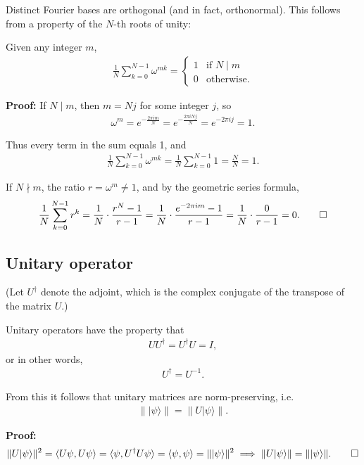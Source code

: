 \documentclass[11pt]{article}
\begin{document}
Distinct Fourier bases are orthogonal (and in fact, orthonormal). This follows from a property of the $N$-th roots of unity:

Given any integer $m$,
\begin{align*}
\frac{1}{N}\sum_{k=0}^{N-1} \omega^{mk} = \begin{cases} 1 & \text{if } N \mid m \\ 0 & \text{otherwise.} \end{cases}
\end{align*}

\textbf{Proof:} If $N \mid m$, then $m = Nj$ for some integer $j$, so
\begin{align*}
\omega^m = e^{-\frac{2\pi i m}{N}} = e^{-\frac{2\pi i Nj}{N}} = e^{-2\pi i j} = 1.
\end{align*}

Thus every term in the sum equals 1, and
\begin{align*}
\frac{1}{N}\sum_{k=0}^{N-1} \omega^{mk} = \frac{1}{N}\sum_{k=0}^{N-1} 1 = \frac{N}{N} = 1.
\end{align*}

If $N \nmid m$, the ratio $r = \omega^m \neq 1$, and by the geometric series formula,
\begin{align*}
\frac{1}{N}\sum_{k=0}^{N-1} r^k = \frac{1}{N}\cdot\frac{r^N - 1}{r - 1} = \frac{1}{N}\cdot\frac{e^{-2\pi i m} - 1}{r-1} = \frac{1}{N}\cdot\frac{0}{r-1} = 0. \qed
\end{align*}

\subsection{Unitary operator}

(Let $U^\dagger$ denote the adjoint, which is the complex conjugate of the transpose of the matrix $U$.)

Unitary operators have the property that
\begin{align*}
U U^\dagger = U^\dagger U = I,
\end{align*}
or in other words,
\begin{align*}
U^\dagger = U^{-1}.
\end{align*}

From this it follows that unitary matrices are norm-preserving, i.e.
\begin{align*}
\| \vert \psi \rangle \| = \| U \vert \psi \rangle \|.
\end{align*}

\textbf{Proof:}
\begin{align*}
\|U\vert\psi\rangle\|^2
= \langle U\psi, U\psi\rangle
= \langle \psi, U^\dagger U\psi\rangle
= \langle \psi, \psi\rangle
= \|\vert\psi\rangle\|^2
\implies \|U\vert\psi\rangle\| = \|\vert\psi\rangle\|. \qed
\end{align*}
\end{document}
